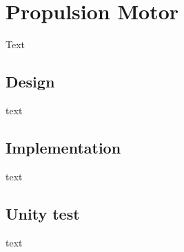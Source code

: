\section{Propulsion Motor}
Text

\subsection{Design}
text

\subsection{Implementation}
text

\subsection{Unity test}
text